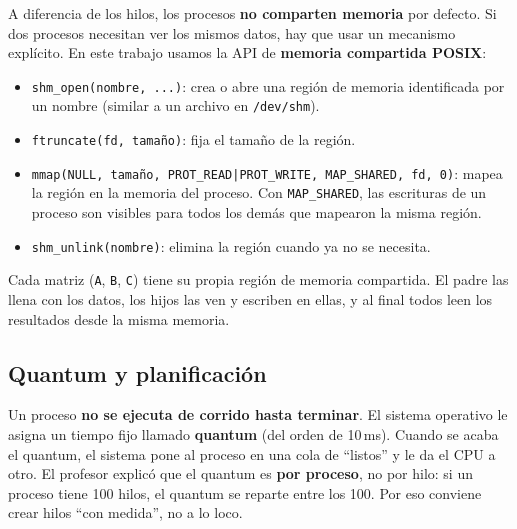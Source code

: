A diferencia de los hilos, los procesos \textbf{no comparten memoria} por defecto. Si dos procesos necesitan ver los mismos datos, hay que usar un mecanismo explícito. En este trabajo usamos la API de \textbf{memoria compartida POSIX}:

\begin{itemize}
    \item \texttt{shm\_open(nombre, ...)}: crea o abre una región de memoria identificada por un nombre (similar a un archivo en \texttt{/dev/shm}).
    \item \texttt{ftruncate(fd, tamaño)}: fija el tamaño de la región.
    \item \texttt{mmap(NULL, tamaño, PROT\_READ|PROT\_WRITE, MAP\_SHARED, fd, 0)}: mapea la región en la memoria del proceso. Con \texttt{MAP\_SHARED}, las escrituras de un proceso son visibles para todos los demás que mapearon la misma región.
    \item \texttt{shm\_unlink(nombre)}: elimina la región cuando ya no se necesita.
\end{itemize}

Cada matriz (\texttt{A}, \texttt{B}, \texttt{C}) tiene su propia región de memoria compartida. El padre las llena con los datos, los hijos las ven y escriben en ellas, y al final todos leen los resultados desde la misma memoria.

\subsection{Quantum y planificación}

Un proceso \textbf{no se ejecuta de corrido hasta terminar}. El sistema operativo le asigna un tiempo fijo llamado \textbf{quantum} (del orden de 10\,ms). Cuando se acaba el quantum, el sistema pone al proceso en una cola de ``listos'' y le da el CPU a otro. El profesor explicó que el quantum es \textbf{por proceso}, no por hilo: si un proceso tiene 100 hilos, el quantum se reparte entre los 100. Por eso conviene crear hilos ``con medida'', no a lo loco.
